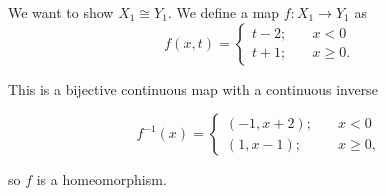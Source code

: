 \documentclass[11pt,a4paper]{article}
\theoremstyle{plain}
\theoremstyle{definition}
\theoremstyle{remark}
\begin{document}
\noindent
We want to show $X_1 \cong Y_1$. We define a map $f: X_1 \rightarrow Y_1$ as 
\begin{equation*}
  f(x,t) =
    \begin{cases}
      t-2; & \quad x < 0\\
      t+1; &\quad x \geq 0.
    \end{cases}       
\end{equation*}

\noindent
This is a bijective continuous map with a continuous inverse

\begin{equation*}
  f^{-1}(x) =
    \begin{cases}
      (-1, x+2); &\quad x < 0\\
      (1, x-1); &\quad x \geq 0,
    \end{cases}       
\end{equation*}

\noindent
so $f$ is a homeomorphism. 

\vspace*{30px} %
\end{document}
